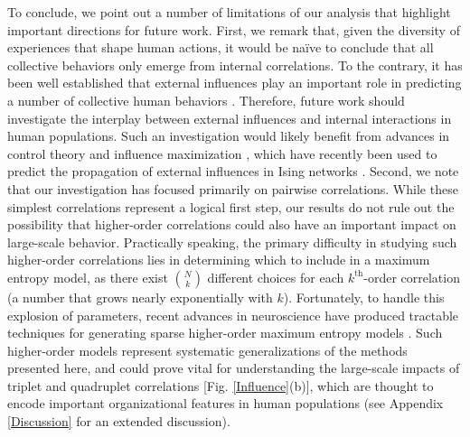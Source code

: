 \documentclass[aps,reprint,superscriptaddress,amsmath,amssymb,longbibliography]{revtex4-1}
\begin{document}
To conclude, we point out a number of limitations of our analysis that highlight important directions for future work. First, we remark that, given the diversity of experiences that shape human actions, it would be na\"{i}ve to conclude that all collective behaviors only emerge from internal correlations. To the contrary, it has been well established that external influences play an important role in predicting a number of collective human behaviors \cite{Sornette-01,Deschatres-01,Candia-01,Crane-01,Peng-01,Bagrow-01}. Therefore, future work should investigate the interplay between external influences and internal interactions in human populations. Such an investigation would likely benefit from advances in control theory and influence maximization \cite{Kempe-01,Morone-01}, which have recently been used to predict the propagation of external influences in Ising networks \cite{Lynn-01, Lynn-02, Lynn-03}. Second, we note that our investigation has focused primarily on pairwise correlations. While these simplest correlations represent a logical first step, our results do not rule out the possibility that higher-order correlations could also have an important impact on large-scale behavior. Practically speaking, the primary difficulty in studying such higher-order correlations lies in determining which to include in a maximum entropy model, as there exist ${N}\choose{k}$ different choices for each $k^{\text{th}}$-order correlation (a number that grows nearly exponentially with $k$). Fortunately, to handle this explosion of parameters, recent advances in neuroscience have produced tractable techniques for generating sparse higher-order maximum entropy models \cite{Ganmor-01}. Such higher-order models represent systematic generalizations of the methods presented here, and could prove vital for understanding the large-scale impacts of triplet and quadruplet correlations [Fig. \ref{Influence}(b)], which are thought to encode important organizational features in human populations \cite{Eckmann-01} (see Appendix \ref{Discussion} for an extended discussion).

%
\end{document}
